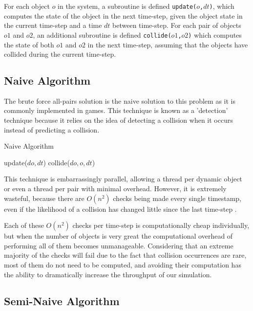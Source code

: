\documentclass[CEJCS,PDF]{cej} %
\begin{document}
For each object $o$ in the system, a subroutine is defined \texttt{update($o$,$dt$)}, which computes the state of the object in the next time-step, given the object state in the current time-step and a time $dt$ between time-step.  For each pair of objects $o1$ and $o2$, an additional subroutine is defined \texttt{collide($o1$,$o2$)} which computes the state of both $o1$ and $o2$ in the next time-step, assuming that the objects have collided during the current time-step.

\subsection{Naive Algorithm}

The brute force all-pairs solution is the naive solution to this problem as it is commonly implemented in games. This technique is known as a 'detection' technique because it relies on the idea of detecting a collision when it occurs instead of predicting a collision.  

\begin{algorithm}
\caption{Naive Algorithm}
\begin{algorithmic}
		\STATE update($do,dt$)  
				\STATE collide($do, o, dt$)
			\ENDIF
		\ENDFOR
	\ENDFOR
\ENDFOR
\end{algorithmic}
\end{algorithm}

This technique is embarrassingly parallel, allowing a thread per dynamic object or even a thread per pair with minimal overhead.  However, it is extremely
wasteful, because there are $O(n^2)$ checks being made every single timestamp, even if the likelihood of a collision has changed little since the last time-step \cite{Seningood}.  

Each of these $O(n^2)$ checks per time-step is computationally cheap individually, but when the number of objects is very great the computational overhead of performing all of them becomes
unmanageable. Considering that an extreme majority of the checks will fail due to the fact that collision occurrences are rare, most of them do not need to be computed, and avoiding their computation has the ability to dramatically increase the 
throughput of our simulation.

\subsection{Semi-Naive Algorithm}
\end{document}
